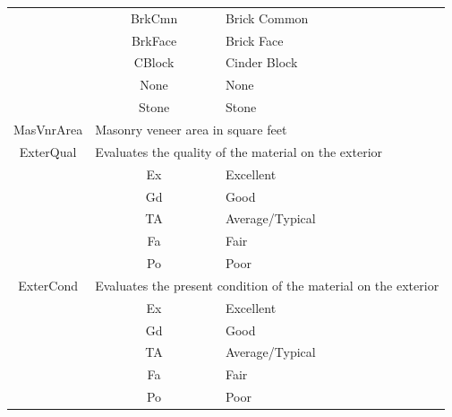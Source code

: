 \documentclass[11pt]{scrartcl} %
\begin{document}
\begin{center}
\begin{tabular}{c c c c c c}
\multicolumn{2}{|c}{} & \multicolumn{1}{c}{BrkCmn} & \multicolumn{3}{l|}{Brick Common}\\
\multicolumn{2}{|c}{} & \multicolumn{1}{c}{BrkFace} & \multicolumn{3}{l|}{Brick Face}\\
\multicolumn{2}{|c}{} & \multicolumn{1}{c}{CBlock} & \multicolumn{3}{l|}{Cinder Block}\\
\multicolumn{2}{|c}{} & \multicolumn{1}{c}{None} & \multicolumn{3}{l|}{None}\\
\multicolumn{2}{|c}{} & \multicolumn{1}{c}{Stone} & \multicolumn{3}{l|}{Stone}\\
\hline
\multicolumn{2}{|c}{MasVnrArea} & \multicolumn{4}{l|}{Masonry veneer area in square feet}\\
\hline
\multicolumn{2}{|c}{ExterQual} & \multicolumn{4}{l|}{Evaluates the quality of the material on the exterior}\\ 
\multicolumn{2}{|c}{} & \multicolumn{1}{c}{Ex} & \multicolumn{3}{l|}{Excellent}\\
\multicolumn{2}{|c}{} & \multicolumn{1}{c}{Gd} & \multicolumn{3}{l|}{Good}\\
\multicolumn{2}{|c}{} & \multicolumn{1}{c}{TA} & \multicolumn{3}{l|}{Average/Typical}\\
\multicolumn{2}{|c}{} & \multicolumn{1}{c}{Fa} & \multicolumn{3}{l|}{Fair}\\
\multicolumn{2}{|c}{} & \multicolumn{1}{c}{Po} & \multicolumn{3}{l|}{Poor}\\
\hline
\multicolumn{2}{|c}{ExterCond} & \multicolumn{4}{l|}{Evaluates the present condition of the material on the exterior}\\ 
\multicolumn{2}{|c}{} & \multicolumn{1}{c}{Ex} & \multicolumn{3}{l|}{Excellent}\\
\multicolumn{2}{|c}{} & \multicolumn{1}{c}{Gd} & \multicolumn{3}{l|}{Good}\\
\multicolumn{2}{|c}{} & \multicolumn{1}{c}{TA} & \multicolumn{3}{l|}{Average/Typical}\\
\multicolumn{2}{|c}{} & \multicolumn{1}{c}{Fa} & \multicolumn{3}{l|}{Fair}\\
\multicolumn{2}{|c}{} & \multicolumn{1}{c}{Po} & \multicolumn{3}{l|}{Poor}\\
\hline
\end{tabular}
\end{center}
\end{document}
